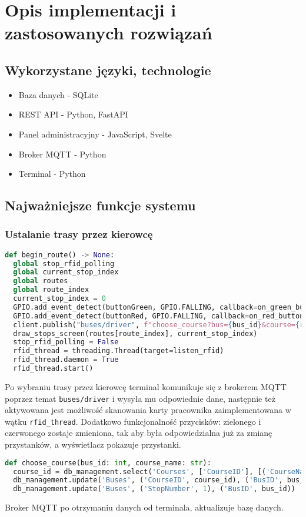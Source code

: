 \section{Opis implementacji i zastosowanych rozwiązań}
\subsection{Wykorzystane języki, technologie}
\begin{itemize}
  \item{Baza danych - SQLite}
  \item{REST API - Python, FastAPI}
  \item{Panel administracyjny - JavaScript, Svelte}
  \item{Broker MQTT - Python}
  \item{Terminal - Python}
\end{itemize}
\subsection{Najważniejsze funkcje systemu}
\subsubsection{Ustalanie trasy przez kierowcę}
\begin{lstlisting}[language={Python}, caption={Terminal, Lokalizacja: \texttt{client/client.py}}]
def begin_route() -> None:
  global stop_rfid_polling
  global current_stop_index
  global routes
  global route_index
  current_stop_index = 0
  GPIO.add_event_detect(buttonGreen, GPIO.FALLING, callback=on_green_button_while_on_route, bouncetime=500)
  GPIO.add_event_detect(buttonRed, GPIO.FALLING, callback=on_red_button_while_on_route, bouncetime=500)
  client.publish("buses/driver", f"choose_course?bus={bus_id}&course={routes[route_index].name}")
  draw_stops_screen(routes[route_index], current_stop_index)
  stop_rfid_polling = False
  rfid_thread = threading.Thread(target=listen_rfid)
  rfid_thread.daemon = True
  rfid_thread.start()
\end{lstlisting}
Po wybraniu trasy przez kierowcę terminal komunikuje się z brokerem MQTT poprzez temat \verb|buses/driver| i wysyła mu odpowiednie dane, następnie też aktywowana jest możliwość skanowania karty pracownika zaimplementowana w wątku \verb|rfid_thread|. Dodatkowo funkcjonalność przycisków: zielonego i czerwonego zostaje zmieniona, tak aby była odpowiedzialna już za zmianę przystanków, a wyświetlacz pokazuje przystanki.
\begin{lstlisting}[language={Python}, caption={Broker MQTT, Lokalizacja: \texttt{backend/mqtt\_server.py}}]
def choose_course(bus_id: int, course_name: str):
  course_id = db_management.select('Courses', ['CourseID'], [('CourseName', course_name)])[0][0]
  db_management.update('Buses', ('CourseID', course_id), ('BusID', bus_id))
  db_management.update('Buses', ('StopNumber', 1), ('BusID', bus_id))
\end{lstlisting}
Broker MQTT po otrzymaniu danych od terminala, aktualizuje bazę danych.

